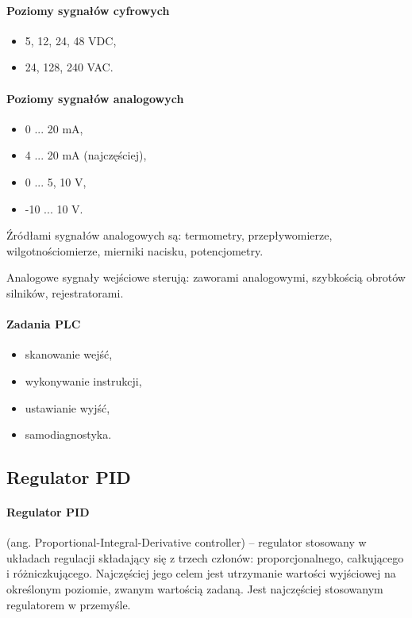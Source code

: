 \documentclass[a4paper,twoside]{report}
\begin{document}
\paragraph{Poziomy sygnałów cyfrowych}
\begin{itemize}
\item 5, 12, 24, 48 VDC,
\item 24, 128, 240 VAC.
\end{itemize}


\paragraph{Poziomy sygnałów analogowych}
\begin{itemize}
\item 0 ... 20 mA,
\item 4 ... 20 mA (najczęściej),
\item 0 ... 5, 10 V,
\item -10 ... 10 V.
\end{itemize}

Źródłami sygnałów analogowych są: termometry, przepływomierze, wilgotnościomierze, mierniki nacisku, potencjometry.

Analogowe sygnały wejściowe sterują: zaworami analogowymi, szybkością obrotów silników, rejestratorami.

\paragraph{Zadania PLC}
\begin{itemize}
\item skanowanie wejść,
\item wykonywanie instrukcji,
\item ustawianie wyjść,
\item samodiagnostyka.
\end{itemize}

\subsection{Regulator PID}

\paragraph{Regulator PID} (ang. Proportional-Integral-Derivative controller) – regulator stosowany w układach regulacji składający się z trzech członów: proporcjonalnego, całkującego i różniczkującego. Najczęściej jego celem jest utrzymanie wartości wyjściowej na określonym poziomie, zwanym wartością zadaną. Jest najczęściej stosowanym regulatorem w przemyśle.\\
\end{document}
